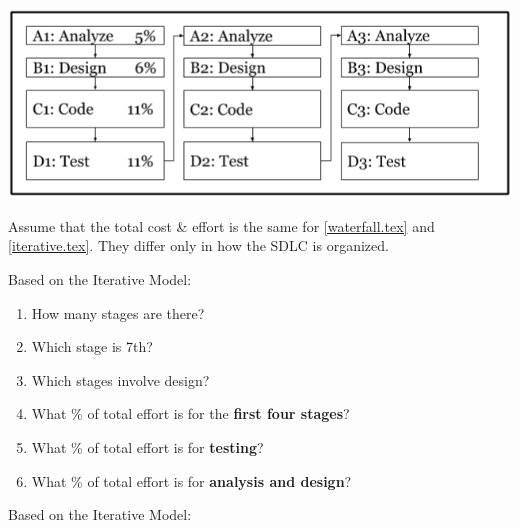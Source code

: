 

\begin{center}
\includegraphics[scale=0.75]{iterative.png}
\end{center}

Assume that the total cost \& effort is the same for \ref{waterfall.tex} and \ref{iterative.tex}.
They differ only in how the SDLC is organized.



\Q Based on the Iterative Model:

\begin{enumerate}%

\item How many stages are there?

\item Which stage is 7th?

\item Which stages involve design?

\item What \% of total effort is for the \textbf{first four stages}?

\item What \% of total effort is for \textbf{testing}?

\item What \% of total effort is for \textbf{analysis and design}?

\end{enumerate}


\Q Based on the Iterative Model:

